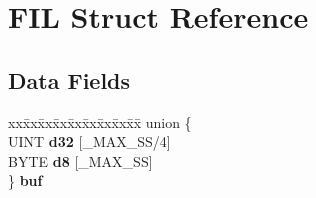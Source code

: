 \hypertarget{struct_f_i_l}{}\section{F\+IL Struct Reference}
\label{struct_f_i_l}
\subsection*{Data Fields}
\begin{DoxyCompactItemize}
\item 
\mbox{\label{struct_f_i_l_a77ee7855071c1503a1ffd3a4088e92af}} 
\begin{tabbing}
xx\=xx\=xx\=xx\=xx\=xx\=xx\=xx\=xx\=\kill
union \{\\
\>UINT {\bfseries d32} \mbox{[}\_MAX\_SS/4\mbox{]}\\
\>BYTE {\bfseries d8} \mbox{[}\_MAX\_SS\mbox{]}\\
\} {\bfseries buf}\\


\end{tabbing}
\end{DoxyCompactItemize}
